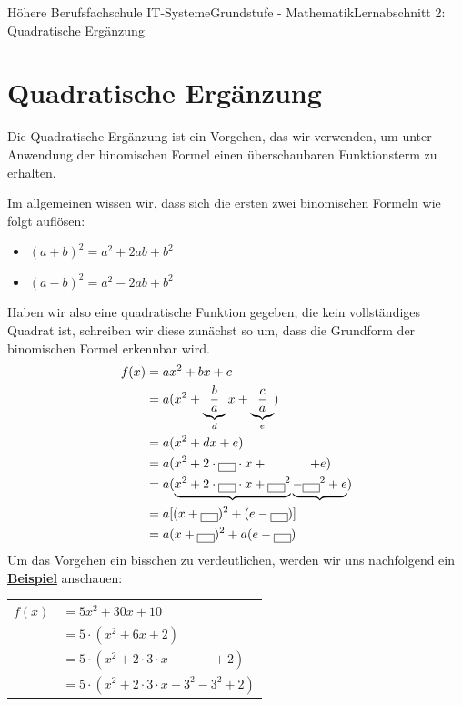 \documentclass[11pt,twocolumn,oneside,openany,headings=optiontotoc,11pt,numbers=noenddot]{article}
\begin{document}
	\begin{worksheet}{Höhere Berufsfachschule IT-Systeme}{Grundstufe - Mathematik}{Lernabschnitt 2: Quadratische Ergänzung}
		\section{Quadratische Ergänzung}
		Die Quadratische Ergänzung ist ein Vorgehen, das wir verwenden, um unter Anwendung der binomischen Formel einen überschaubaren Funktionsterm zu erhalten.\\
		\par\noindent
		Im allgemeinen wissen wir, dass sich die ersten zwei binomischen Formeln wie folgt auflösen:
		\begin{itemize}
			\item[] \((a+b)^2 = a^2 + 2ab + b^2\)
			\item[] \((a-b)^2 = a^2 - 2ab + b^2\)
		\end{itemize}
		Haben wir also eine quadratische Funktion gegeben, die kein vollständiges Quadrat ist, schreiben wir diese zunächst so um, dass die Grundform der binomischen Formel erkennbar wird.\\
		\begin{align*}
			f(x) & = ax^2 + bx +c\\
			& = a(x^2+\underbrace{\frac{b}{a}}_{d}x + \underbrace{\frac{c}{a}}_{e})\\
			& = a(x^2 + dx + e)\\
			& = a(x^2 + 2\cdot\fbox{\ \ }\cdot{}x +\ \ \ \ \ \ \ \ \ \ + e)\\
			& = a(\underbrace{x^2 + 2\cdot\fbox{\ \ }\cdot{}x + \fbox{\ \ }^2} \underbrace{- \fbox{\ \ }^2 + e})\\
			& = a[(x+\fbox{\ \ })^2 + (e-\fbox{\ \ })]\\
			& = a(x+\fbox{\ \ })^2 + a(e-\fbox{\ \ })
		\end{align*}
		Um das Vorgehen ein bisschen zu verdeutlichen, werden wir uns nachfolgend ein \underline{\textbf{Beispiel}} anschauen:\\
		\par\noindent
		\begin{tabularx}{0.48\textwidth}{lX}
			\(f(x)\) & \( = 5x^2 + 30x +10\)\\
			& \(= 5\cdot(x^2 + 6x + 2)\)\\
			& \(= 5\cdot(x^2 + 2\cdot{}3\cdot{}x +\ \ \ \ \ \ \ \ \ \ + 2)\)\\
			& \(= 5\cdot(x^2 + 2\cdot{}3\cdot{}x + 3^2 - 3^2 + 2)\)\\

\end{tabularx}
\end{worksheet}
\end{document}
